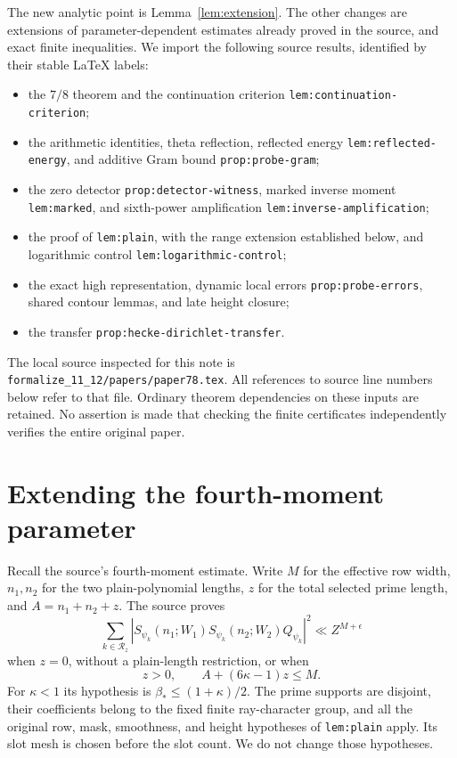 \documentclass[11pt]{article}
\newcommand{\Bstar}{\beta_*}
\begin{document}
The new analytic point is Lemma~\ref{lem:extension}. The other changes are
extensions of parameter-dependent estimates already proved in the source,
and exact finite inequalities. We import the following source results,
identified by their stable \LaTeX{} labels:
\begin{itemize}
\item the $7/8$ theorem and the continuation criterion
\texttt{lem:continuation-criterion};
\item the arithmetic identities, theta reflection, reflected energy
\texttt{lem:reflected-energy}, and additive Gram bound
\texttt{prop:probe-gram};
\item the zero detector \texttt{prop:detector-witness}, marked inverse
moment \texttt{lem:marked}, and sixth-power amplification
\texttt{lem:inverse-amplification};
\item the proof of \texttt{lem:plain}, with the range extension established
below, and logarithmic control \texttt{lem:logarithmic-control};
\item the exact high representation, dynamic local errors
\texttt{prop:probe-errors}, shared contour lemmas, and late height closure;
\item the transfer \texttt{prop:hecke-dirichlet-transfer}.
\end{itemize}
The local source inspected for this note is
\texttt{formalize\_11\_12/papers/paper78.tex}. All references to source
line numbers below refer to that file. Ordinary theorem dependencies on
these inputs are retained. No assertion is made that checking the finite
certificates independently verifies the entire original paper.

\section{Extending the fourth-moment parameter}

Recall the source's fourth-moment estimate. Write $M$ for the effective row
width, $n_1,n_2$ for the two plain-polynomial lengths, $z$ for the total
selected prime length, and $A=n_1+n_2+z$. The source proves
\[
 \sum_{k\in\mathcal R_z}
 |S_{\psi_k}(n_1;W_1)S_{\psi_k}(n_2;W_2)Q_{\psi_k}|^2
 \ll Z^{M+\epsilon}
\]
when $z=0$, without a plain-length restriction, or when
\begin{equation}\label{eq:affine}
 z>0,\qquad A+(6\kappa-1)z\le M.
\end{equation}
For $\kappa<1$ its hypothesis is $\Bstar\le(1+\kappa)/2$.
The prime supports are disjoint, their coefficients belong to the fixed
finite ray-character group, and all the original row, mask, smoothness,
and height hypotheses of \texttt{lem:plain} apply. Its slot mesh is chosen
before the slot count. We do not change those hypotheses.
\end{document}
